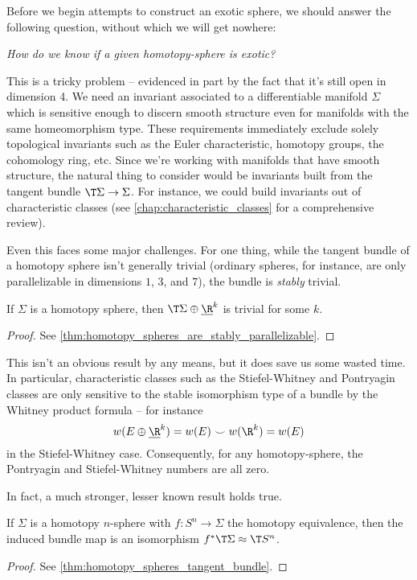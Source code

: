 Before we begin attempts to construct an exotic sphere, we should answer the following question, without which we will get nowhere:
\begin{center}
	\textsl{How do we know if a given homotopy-sphere is exotic?}
\end{center}

This is a tricky problem -- evidenced in part by the fact that it's still open in dimension 4. We need an invariant associated to a differentiable manifold $\Sigma$ which is sensitive enough to discern smooth structure even for manifolds with the same homeomorphism type.
These requirements immediately exclude solely topological invariants such as the Euler characteristic, homotopy groups, the cohomology ring, etc. Since we're working with manifolds that have smooth structure, the natural thing to consider would be invariants built from the tangent bundle $\T \Sigma \to \Sigma$. For instance, we could build invariants out of characteristic classes (see \cref{chap:characteristic_classes} for a comprehensive review).

Even this faces some major challenges. For one thing, while the tangent bundle of a homotopy sphere isn't generally trivial (ordinary spheres, for instance, are only parallelizable in dimensions $1$, $3$, and $7$), the bundle is \emph{stably} trivial.
\begin{theorem*}
	If $\Sigma$ is a homotopy sphere, then $\T \Sigma \oplus \underline{\R}^k$ is trivial for some $k$.
\end{theorem*}
\begin{proof}
	See \cref{thm:homotopy_spheres_are_stably_parallelizable}.
\end{proof}
This isn't an obvious result by any means, but it does save us some wasted time. In particular, characteristic classes such as the Stiefel-Whitney and Pontryagin classes are only sensitive to the stable isomorphism type of a bundle by the Whitney product formula -- for instance
\[
	w(E\oplus\underline{\R}^k) = w(E)\smile w(\R^k) = w(E)
\]
in the Stiefel-Whitney case. Consequently, for any homotopy-sphere, the Pontryagin and Stiefel-Whitney numbers are all zero.

In fact, a much stronger, lesser known result holds true.
\begin{theorem*}
	If $\Sigma$ is a homotopy $n$-sphere with $f : S^n \to \Sigma$ the homotopy equivalence, then the induced bundle map is an isomorphism $f^*\T\Sigma \approx \T S^n$.
\end{theorem*}
\begin{proof}
	See \cref{thm:homotopy_spheres_tangent_bundle}.
\end{proof}

